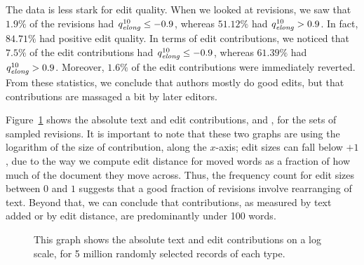 The data is less stark for edit quality.
When we looked at revisions, we saw that $1.9\%$ of the revisions
had $\quality{elong}{10}{} \le -0.9$, whereas $51.12\%$ had
$\quality{elong}{10}{} > 0.9$.
In fact, $84.71\%$ had positive edit quality.
In terms of edit contributions, we noticed that $7.5\%$ of the
edit contributions had $\quality{elong}{10}{} \le -0.9$, whereas
$61.39\%$ had $\quality{elong}{10}{} > 0.9$.
Moreover, $1.6\%$ of the edit contributions were immediately
reverted.
From these statistics, we conclude that authors mostly do good
edits, but that contributions are massaged a bit by later editors.

Figure~\ref{fig-revs-contrib} shows the absolute text and edit 
contributions,  and , for the sets of sampled revisions.
It is important to note that these two graphs are using
the logarithm of the size of contribution, along the $x$-axis;
edit sizes can fall below $+1$, due to the way we compute
edit distance for moved words as a fraction of how much of
the document they move across.
Thus, the frequency count for edit sizes between $0$ and $1$
suggests that a good fraction of revisions involve rearranging
of text.
Beyond that, we can conclude that contributions, as measured
by text added or by edit distance, are predominantly under
100 words.
%
\begin{figure}[tbhp]
    \begin{center}
    \end{center}
    \caption[Measuring total edit and text contribution over revisions]{
        This graph shows the absolute text and edit contributions 
        on a log scale, for 5 million randomly selected records
	of each type.
    }
    \label{fig-revs-contrib}
\end{figure}
